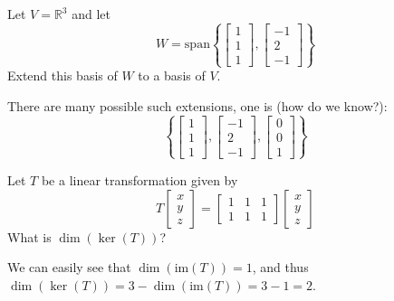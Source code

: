 \documentclass{ximera}
\begin{document}
\begin{problem}\label{prb:6.30}
Let $V=\mathbb{R}^{3}$ and let
\begin{equation*}
W=\mbox{span}\left\{ \left[
\begin{array}{r}
1 \\
1 \\
1
\end{array}
\right] ,\left[
\begin{array}{r}
-1 \\
2 \\
-1
\end{array}
\right] \right\}
\end{equation*}
Extend this basis of $W$ to a basis of $V$.

\begin{hint}
There are many possible such extensions, one is (how do we know?):
\begin{equation*}
\left\{ \left[
\begin{array}{r}
1 \\
1 \\
1
\end{array}
\right] ,\left[
\begin{array}{r}
-1 \\
2 \\
-1
\end{array}
\right] ,\left[
\begin{array}{r}
0  \\
0\\
1
\end{array}
\right]
\right\}
\end{equation*}
\end{hint}
\end{problem}

\begin{problem}\label{prb:6.31}
 Let $T$ be a linear transformation given by
\[
T \left[ \begin{array}{r}
x\\
y \\
z
\end{array}\right] = \left[ \begin{array}{rrr}
1 & 1 & 1 \\
1 & 1 & 1
\end{array}\right]
\left[ \begin{array}{r}
x\\
y \\
z
\end{array}\right]
\]
What is $\dim  ( \ker \left( T \right) )$?

\begin{hint}
We can easily see that $\dim  ( \mbox{im} \left( T \right) ) =1$, and thus
$\dim  ( \ker \left( T \right) ) = 3 - \dim  ( \mbox{im} \left( T \right) ) = 3- 1 = 2$.
\end{hint}
\end{problem}
\end{document}
